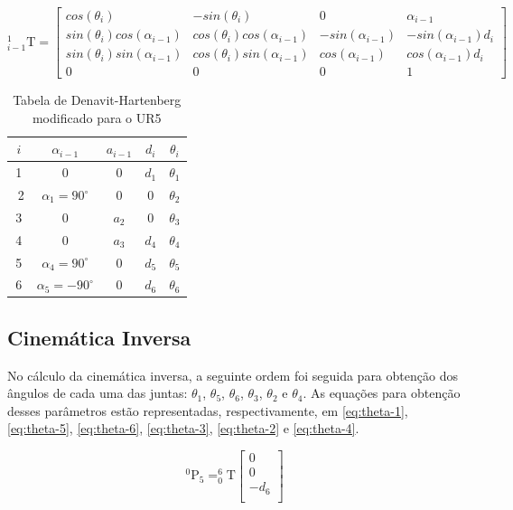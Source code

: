 \begin{equation}\label{eq:dh-modificado}
_{i-1}^{1}\textrm{T}=\begin{bmatrix}
cos(\theta_i) & -sin(\theta_i) & 0 & \alpha _{i-1}\\ 
sin(\theta_i)cos(\alpha _{i-1})& cos(\theta_i)cos(\alpha _{i-1})  & -sin(\alpha _{i-1}) & -sin(\alpha _{i-1})d_i\\ 
sin(\theta_i)sin(\alpha _{i-1})&  cos(\theta_i)sin(\alpha _{i-1}) & cos(\alpha _{i-1}) & cos(\alpha _{i-1})d_i\\ 
0 & 0 & 0 & 1
\end{bmatrix}
\end{equation}

\begin{table}[h!]
	\centering
	\caption{Tabela de Denavit-Hartenberg modificado para o UR5}
	\label{tab:tabela-dh}
	\begin{tabular}{ c| c c c c }
		$i$ & $\alpha_{i-1}$ & $a_{i-1}$ & $d_i$ & $\theta_i$ \\ 
		\hline
		1  & 0 & 0 & $d_1$ & $\theta_1$ \\  ​
		​2 & $\alpha_1=90^{\circ}$ & 0 & 0 & $\theta_2$  \\
		​3 & 0 & $a_2$  & 0 & $\theta_3$ \\
		​4 & 0 & $a_3$ & $d_4$ & $\theta_4$ \\
		​5 & $\alpha_4=90^{\circ}$ & 0 & $d_5$ & $\theta_5$ \\
		​6 & $\alpha_5=-90^{\circ}$ & 0 & $d_6$ & $\theta_6$ 
	\end{tabular}
\end{table}

\subsection{Cinemática Inversa}
\label{ssec:cinematica-inversa}

No cálculo da cinemática inversa, a seguinte ordem foi seguida para obtenção dos ângulos de cada uma das juntas: $\theta_{1}$, $\theta_{5}$, $\theta_{6}$, $\theta_{3}$, $\theta_{2}$ e $\theta_{4}$. As equações para obtenção desses parâmetros estão representadas, respectivamente, em \ref{eq:theta-1}, \ref{eq:theta-5}, \ref{eq:theta-6}, \ref{eq:theta-3}, \ref{eq:theta-2} e \ref{eq:theta-4}.

\begin{equation}\label{eq:translacao-frame-5}
^{0}\textrm{P}_{5} = _{0}^{6}\textrm{T}
	\begin{bmatrix}
		0 \\ 
		0 \\ 
		-d_{6}\\ 
	\end{bmatrix}
\end{equation}

